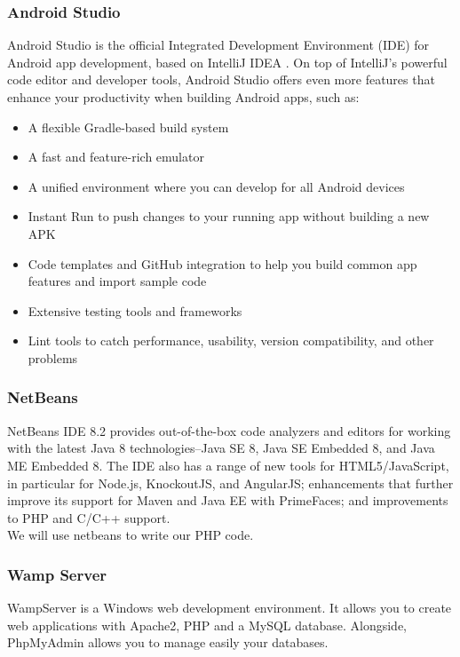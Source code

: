\documentclass[12pt]{article}
\begin{document}
		\subsubsection{Android Studio}
		Android Studio is the official Integrated Development Environment (IDE) for Android app development, based on IntelliJ IDEA . On top of IntelliJ's powerful code editor and developer tools, Android Studio offers even more features that enhance your productivity when building Android apps, such as\cite{astudio}:
		\begin{itemize}
			\item A flexible Gradle-based build system
			\item A fast and feature-rich emulator
			\item A unified environment where you can develop for all Android devices
			\item Instant Run to push changes to your running app without building a new APK
			\item Code templates and GitHub integration to help you build common app features and import sample code
			\item Extensive testing tools and frameworks
			\item Lint tools to catch performance, usability, version compatibility, and other problems
		\end{itemize}
		\subsubsection{NetBeans}
		NetBeans IDE 8.2 provides out-of-the-box code analyzers and editors for working with the latest Java 8 technologies--Java SE 8, Java SE Embedded 8, and Java ME Embedded 8. The IDE also has a range of new tools for HTML5/JavaScript, in particular for Node.js, KnockoutJS, and AngularJS; enhancements that further improve its support for Maven and Java EE with PrimeFaces; and improvements to PHP and C/C++ support.\cite{netbeans}  \\
		
		\noindent We will use netbeans to write our PHP code. 
		
		\subsubsection{Wamp Server}
		WampServer is a Windows web development environment. It allows you to create web applications with Apache2, PHP and a MySQL database. Alongside, PhpMyAdmin allows you to manage easily your databases.\\
		
\end{document}

